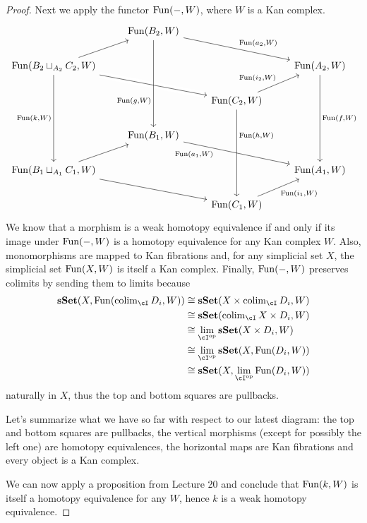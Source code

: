 \documentclass[a4paper,11pt,openany]{scrartcl}
\begin{document}
\begin{proof}
    Next we apply the functor $\operatorname{Fun}(-,W)$, where $W$ is a Kan
    complex.
    \[\begin{tikzcd}
        & {\Fun(B_2,W)} \\
        {\Fun(B_2\sqcup_{A_2}C_2,W)} &&& {\Fun(A_2,W)} \\
        && {\Fun(C_2,W)} \\
        & {\Fun(B_1,W)} \\
        {\Fun(B_1\sqcup_{A_1}C_1,W)} &&& {\Fun(A_1,W)} \\
        && {\Fun(C_1,W)}
        \arrow["{\Fun(h,W)}"{pos=0.3}, from=3-3, to=6-3, crossing over]
        \arrow[from=5-1, to=6-3]
        \arrow["{\Fun(i_1,W)}"', from=6-3, to=5-4]
        \arrow[from=5-1, to=4-2]
        \arrow["{\Fun(a_1,W)}"'{pos=0.3}, from=4-2, to=5-4]
        \arrow["{\Fun(f,W)}", from=2-4, to=5-4]
        \arrow["{\Fun(k,W)}"', from=2-1, to=5-1]
        \arrow[from=2-1, to=3-3, crossing over]
        \arrow["{\Fun(a_2,W)}", from=1-2, to=2-4]
        \arrow["{\Fun(i_2,W)}", from=3-3, to=2-4]
        \arrow[from=2-1, to=1-2]
        \arrow["{\Fun(g,W)}"'{pos=0.7}, from=1-2, to=4-2]
    \end{tikzcd}\]
    We know that a morphism is a weak homotopy equivalence if and only if its
    image under $\operatorname{Fun}(-,W)$ is a homotopy equivalence for any Kan complex
    $W$. Also, monomorphisms are mapped to Kan fibrations and, for any
    simplicial set $X$, the simplicial set $\operatorname{Fun}(X,W)$ is itself a Kan complex.
    Finally, $\operatorname{Fun}(-,W)$ preserves colimits by sending them to limits because
    \begin{align*}
        \sSet(X,\Fun(\colim_{\cI}D_i,W))
        &\cong\sSet(X\times\colim_{\cI}D_i,W) \\
        &\cong\sSet(\colim_{\cI} X\times D_i,W) \\
        &\cong\lim_{\cI^{\op}}\sSet(X\times D_i,W) \\
        &\cong\lim_{\cI^{\op}}\sSet(X,\Fun(D_i,W)) \\
        &\cong\sSet(X,\lim_{\cI^{\op}}\Fun(D_i,W))
    \end{align*}
    naturally in $X$, thus the top and bottom squares are pullbacks.

    Let's summarize what we have so far with respect to our latest diagram: the
    top and bottom squares are pullbacks, the vertical morphisms (except for
    possibly the left one) are homotopy equivalences, the horizontal maps are
    Kan fibrations and every object is a Kan complex.

    We can now apply a proposition from Lecture 20 and conclude that $\operatorname{Fun}(k,W)$
    is itself a homotopy equivalence for any $W$, hence $k$ is a weak homotopy
    equivalence.
\end{proof}
\end{document}
